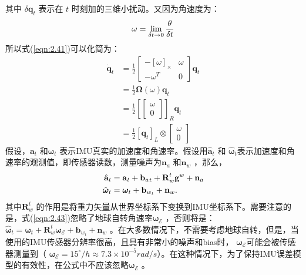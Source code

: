 其中 $\delta \mathbf{q}_t $ 表示在 $t$  时刻加的三维小扰动。又因为角速度为：
\[
\setlength{\abovedisplayskip}{6pt}
\setlength{\belowdisplayskip}{6pt}
{\omega}=\lim _{\delta t \rightarrow 0} \frac{\theta}{\delta t} 
\]
所以式(\ref{eqn:2.41})可以化简为：
\begin{equation}
\label{eqn:2.42}
\begin{aligned}
\dot{\mathbf{q}}_{t}&=\frac{1}{2} \left[ \begin{array}{cc}{-[\omega]_{\times}} & {\omega} \\ {-\omega^{T}} & {0}\end{array}\right] \mathbf{q}_{t} \\  
&= \frac{1}{2} \bm{\Omega}(\omega) \mathbf{q}_{t} \\
&= \frac{1}{2} {\left[\left[ \begin{array}{l}{\omega} \\ {0}\end{array}\right]\right]}_R \mathbf{q}_{t} \\
&= \frac{1}{2} \left[\mathbf{q}_{t}\right]_L \otimes \left[ \begin{array}{l}{\omega} \\ {0}\end{array}\right]
\end{aligned}
\end{equation}
假设，$\mathbf{a}_t $ 和$\bm{\omega}_t $ 表示IMU真实的加速度和角速率。假设用$\hat{\textbf{a}}_t $ 和 $\hat{\bm{\omega}}_t $表示加速度和角速率的观测值，即传感器读数，测量噪声为$\mathbf{n}_a $ 和$\mathbf{n}_w $ ，那么，
\begin{equation}
\label{eqn:2.43}
\setlength{\abovedisplayskip}{6pt}
\setlength{\belowdisplayskip}{6pt}
\begin{split}
\hat{\textbf{a}}_t&=\textbf{a}_t+{\textbf{b}_a}_t+\textbf{R}_w^t\textbf{g}^w+\textbf{n}_a \\
\hat{\bm{\omega}}_t&=\bm{\omega}_t+\mathbf{b}_{w_t}+\mathbf{n}_w.
\end{split}
\end{equation}
其中$\mathbf{R}_w^t $ 的作用是将重力矢量从世界坐标系下变换到IMU坐标系下。需要注意的是，式(\ref{eqn:2.43})忽略了地球自转角速率$\bm{\omega}_\mathcal{E} $ ，否则将是：$\hat{\bm{\omega}}_t=\bm{\omega}_t+ \mathbf{R}_w^t \bm{\omega}_\mathcal{E} +\mathbf{b}_{w_t}+\mathbf{n}_w $ 。在大多数情况下，不需要考虑地球自转，但是，当使用的IMU传感器分辨率很高，且具有非常小的噪声和bias时， $\bm{\omega}_\mathcal{E} $可能会被传感器测量到（ $\bm{\omega}_\mathcal{E} = {15}^{\circ}/h \approx 7.3×10^{-5} rad/s $）。在这种情况下，为了保持IMU误差模型的有效性，在公式中不应该忽略$\bm{\omega}_\mathcal{E} $ 。

